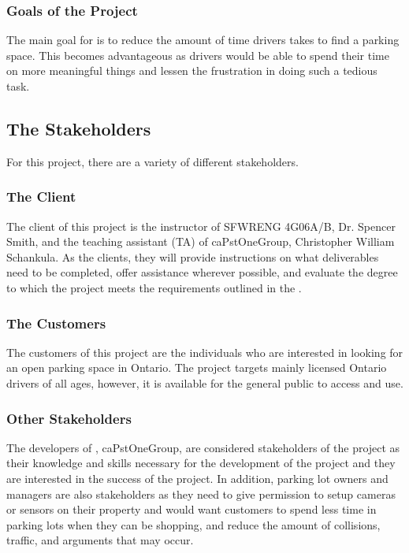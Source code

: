\documentclass[12pt,letterpaper]{article}
\newcommand{\term}[2][]{\ifthenelse{\equal{#1}{}}{\hyperref[Term:#2]{\textbf{#2}}}{\hyperref[Term:#1]{\textbf{#2}}}}
\begin{document}
\subsubsection{Goals of the Project}
The main goal for \progname \space is to reduce the amount of time drivers takes
to find a parking space. This becomes advantageous as drivers would be able to
spend their time on more meaningful things and lessen the frustration in doing
such a tedious task.

\subsection{The Stakeholders}
For this project, there are a variety of different stakeholders. 

\subsubsection{The Client}
The client of this project is the instructor of SFWRENG 4G06A/B, Dr. Spencer
Smith, and the teaching assistant (TA) of caPstOneGroup, Christopher William
Schankula. As the clients, they will provide instructions on what deliverables
need to be completed, offer assistance wherever possible, and evaluate the
degree to which the project meets the requirements outlined in the \term{SRS}.

\subsubsection{The Customers}
The customers of this project are the individuals who are interested in looking
for an open parking space in Ontario. The project targets mainly licensed
Ontario drivers of all ages, however, it is available for the general public to
access and use.

\subsubsection{Other Stakeholders}
The developers of \progname, caPstOneGroup, are considered stakeholders of the
project as their knowledge and skills necessary for the development of the
project and they are interested in the success of the project. In addition,
parking lot owners and managers are also stakeholders as they need to give
permission to setup cameras or sensors on their property and would want
customers to spend less time in parking lots when they can be shopping, and
reduce the amount of collisions, traffic, and arguments that may occur.
\end{document}

